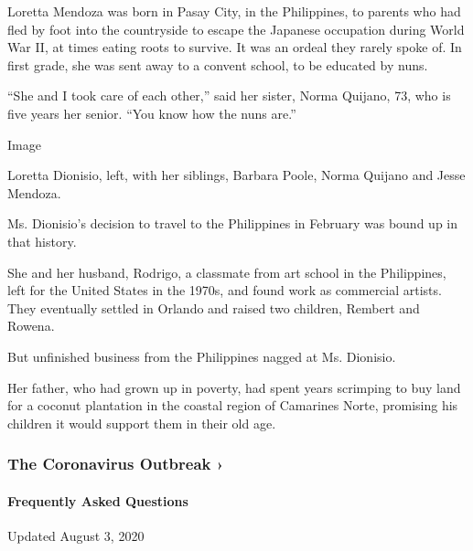 Loretta Mendoza was born in Pasay City, in the Philippines, to parents
who had fled by foot into the countryside to escape the Japanese
occupation during World War II, at times eating roots to survive. It was
an ordeal they rarely spoke of. In first grade, she was sent away to a
convent school, to be educated by nuns.

``She and I took care of each other,'' said her sister, Norma Quijano,
73, who is five years her senior. ``You know how the nuns are.''

Image

Loretta Dionisio, left, with her siblings, Barbara Poole, Norma Quijano
and Jesse Mendoza.

Ms. Dionisio's decision to travel to the Philippines in February was
bound up in that history.

She and her husband, Rodrigo, a classmate from art school in the
Philippines, left for the United States in the 1970s, and found work as
commercial artists. They eventually settled in Orlando and raised two
children, Rembert and Rowena.

But unfinished business from the Philippines nagged at Ms. Dionisio.

Her father, who had grown up in poverty, had spent years scrimping to
buy land for a coconut plantation in the coastal region of Camarines
Norte, promising his children it would support them in their old age.

\href{https://www.nytimes.com/news-event/coronavirus?action=click\&pgtype=Article\&state=default\&region=MAIN_CONTENT_3\&context=storylines_faq}{}

\hypertarget{the-coronavirus-outbreak-}{%
\subsubsection{The Coronavirus Outbreak
›}\label{the-coronavirus-outbreak-}}

\hypertarget{frequently-asked-questions}{%
\paragraph{Frequently Asked
Questions}\label{frequently-asked-questions}}

Updated August 3, 2020

